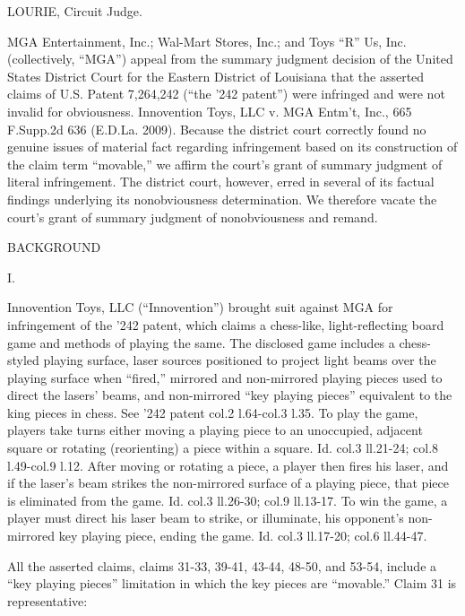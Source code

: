 
LOURIE, Circuit Judge.

MGA Entertainment, Inc.; Wal-Mart Stores, Inc.; and Toys ``R'' Us, Inc.
(collectively, ``MGA'') appeal from the summary judgment decision of the United
States District Court for the Eastern District of Louisiana that the asserted
claims of U.S. Patent 7,264,242 (``the '242 patent'') were infringed and were
not invalid for obviousness. Innovention Toys, LLC v. MGA Entm't, Inc., 665
F.Supp.2d 636 (E.D.La. 2009). Because the district court correctly found no
genuine issues of material fact regarding infringement based on its
construction of the claim term ``movable,'' we affirm the court's grant of
summary judgment of literal infringement. The district court, however, erred in
several of its factual findings underlying its nonobviousness determination. We
therefore vacate the court's grant of summary judgment of nonobviousness and
remand.

{\centering
BACKGROUND
\par}

{\centering
I.
\par}

Innovention Toys, LLC (``Innovention'') brought suit against MGA for
infringement of the '242 patent, which claims a chess-like, light-reflecting
board game and methods of playing the same. The disclosed game includes a
chess-styled playing surface, laser sources positioned to project light beams
over the playing surface when ``fired,'' mirrored and non-mirrored playing
pieces used to direct the lasers' beams, and non-mirrored ``key playing
pieces'' equivalent to the king pieces in chess. See '242 patent col.2
l.64-col.3 l.35. To play the game, players take turns either moving a playing
piece to an unoccupied, adjacent square or rotating (reorienting) a piece
within a square. Id. col.3 ll.21-24; col.8 l.49-col.9 l.12. After moving or
rotating a piece, a player then fires his laser, and if the laser's beam
strikes the non-mirrored surface of a playing piece, that piece is eliminated
from the game. Id. col.3 ll.26-30; col.9 ll.13-17. To win the game, a player
must direct his laser beam to strike, or illuminate, his opponent's
non-mirrored key playing piece, ending the game. Id. col.3 ll.17-20; col.6
ll.44-47.

All the asserted claims, claims 31-33, 39-41, 43-44, 48-50, and 53-54, include a
``key playing pieces'' limitation in which the key pieces are ``movable.''
Claim 31 is representative:

